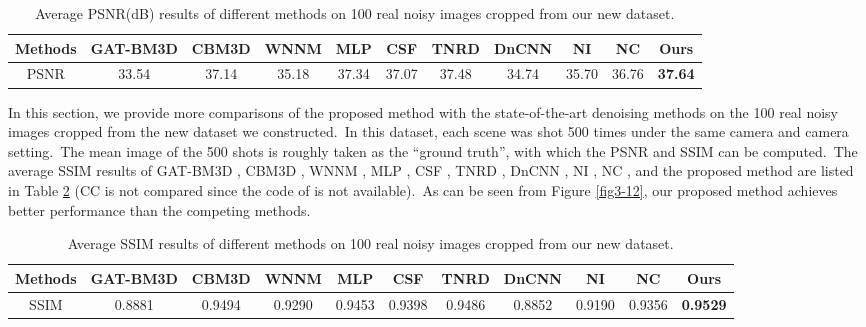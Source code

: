 \begin{table}
\begin{adjustwidth}{-2cm}{}
\scriptsize
\caption{Average PSNR(dB) results of different methods on 100 real noisy images cropped from our new dataset.}
\vspace{-4mm}
\label{tab3-6}
\begin{center}
\renewcommand\arraystretch{1}
\begin{tabular}{|c||c|c|c|c|c|c|c|c|c|c|}
\hline
Methods
&\textbf{GAT-BM3D}
&\textbf{CBM3D}
&\textbf{WNNM}
&\textbf{MLP}
&\textbf{CSF} 
&\textbf{TNRD} 
&\textbf{DnCNN}
&\textbf{NI} 
&\textbf{NC} 
&\textbf{Ours} 
\\
\hline
PSNR  
& 33.54 & 37.14 & 35.18 & 37.34 & 37.07 & 37.48 & 34.74 & 35.70 & 36.76 & \textbf{37.64}
\\
\hline
\end{tabular}
\end{center}
\end{adjustwidth}
\end{table}

In this section, we provide more comparisons of the proposed method with the state-of-the-art denoising methods on the 100 real noisy images cropped from the new dataset we constructed.\ In this dataset, each scene was shot 500 times under the same camera and camera setting.\ The mean image of the 500 shots is roughly taken as the ``ground truth'', with which the PSNR and SSIM can be computed.\ The average  SSIM results of GAT-BM3D \cite{makitalo2013optimal}, CBM3D \cite{bm3d}, WNNM \cite{wnnm}, MLP \cite{mlp}, CSF \cite{csf}, TNRD \cite{tnrd}, DnCNN \cite{dncnn}, NI \cite{neatimage}, NC \cite{noiseclinic,ncwebsite}, and the proposed method are listed in Table \ref{tab3-7} (CC is not compared since the code of \cite{crosschannel2016} is not available).\ As can be seen from Figure \ref{fig3-12}, our proposed method achieves better performance than the competing methods.


\begin{table}[htpb]
\begin{adjustwidth}{-1cm}{}
\scriptsize
\caption{Average SSIM \cite{ssim} results of different methods on 100 real noisy images cropped from our new dataset.}
\label{tab3-7}
\begin{center}
\renewcommand\arraystretch{1}
\begin{tabular}{|c||c|c|c|c|c|c|c|c|c|c|}
\hline
Methods
&\textbf{GAT-BM3D}
&\textbf{CBM3D}
&\textbf{WNNM}
&\textbf{MLP}
&\textbf{CSF} 
&\textbf{TNRD} 
&\textbf{DnCNN}
&\textbf{NI} 
&\textbf{NC} 
&\textbf{Ours} 
\\
\hline
SSIM  
& 0.8881 & 0.9494 & 0.9290 & 0.9453 & 0.9398 & 0.9486 & 0.8852 & 0.9190 & 0.9356 & \textbf{0.9529}
\\
\hline
\end{tabular}
\end{center}
\end{adjustwidth}
\end{table}



